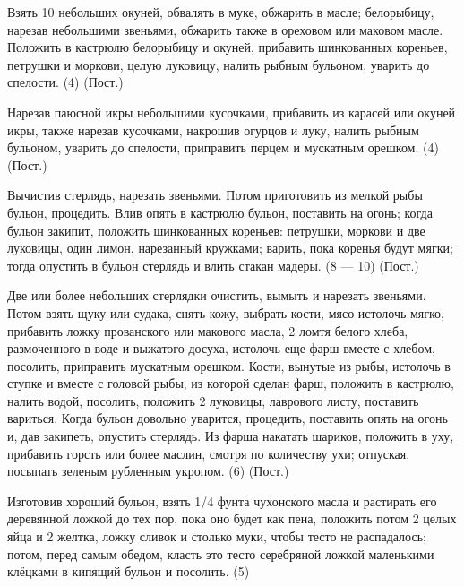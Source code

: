
Взять 10 небольших окуней, обвалять в муке, обжарить в масле; белорыбицу, нарезав небольшими звеньями, обжарить также в ореховом или маковом масле. Положить в кастрюлю белорыбицу и окуней, прибавить шинкованных кореньев, петрушки и моркови, целую луковицу, налить рыбным бульоном, уварить до спелости. (4) (Пост.)


Нарезав паюсной икры небольшими кусочками, прибавить из карасей или окуней икры, также нарезав кусочками, накрошив огурцов и луку, налить рыбным бульоном, уварить до спелости, приправить перцем и мускатным орешком. (4) (Пост.)


Вычистив стерлядь, нарезать звеньями. Потом приготовить из мелкой рыбы бульон, процедить. Влив опять в кастрюлю бульон, поставить на огонь; когда бульон закипит, положить шинкованных кореньев: петрушки, моркови и две луковицы, один лимон, нарезанный кружками; варить, пока коренья будут мягки; тогда опустить в бульон стерлядь и влить стакан мадеры. (8 — 10) (Пост.)


Две или более небольших стерлядки очистить, вымыть и нарезать звеньями. Потом взять щуку или судака, снять кожу, выбрать кости, мясо истолочь мягко, прибавить ложку прованского или макового масла, 2 ломтя белого хлеба, размоченного в воде и выжатого досуха, истолочь еще фарш вместе с хлебом, посолить, приправить мускатным орешком. Кости, вынутые из рыбы, истолочь в ступке и вместе с головой рыбы, из которой сделан фарш, положить в кастрюлю, налить водой, посолить, положить 2 луковицы, лаврового листу, поставить вариться. Когда бульон довольно уварится, процедить, поставить опять на огонь и, дав закипеть, опустить стерлядь. Из фарша накатать шариков, положить в уху, прибавить горсть или более маслин, смотря по количеству ухи; отпуская, посыпать зеленым рубленным укропом. (6) (Пост.)


Изготовив хороший бульон, взять 1/4 фунта чухонского масла и растирать его деревянной ложкой до тех пор, пока оно будет как пена, положить потом 2 целых яйца и 2 желтка, ложку сливок и столько муки, чтобы тесто не распадалось; потом, перед самым обедом, класть это тесто серебряной ложкой маленькими клёцками в кипящий бульон и посолить. (5)

